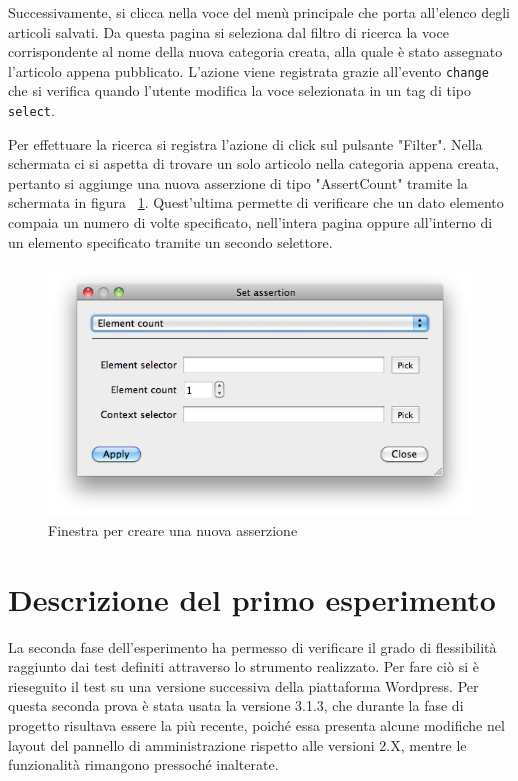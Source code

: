 Successivamente, si clicca nella voce del menù principale che porta all'elenco degli articoli salvati. Da questa pagina si seleziona dal filtro di ricerca la voce corrispondente al nome della nuova categoria creata, alla quale è stato assegnato l'articolo appena pubblicato. L'azione viene registrata grazie all'evento \verb|change| che si verifica quando l'utente modifica la voce selezionata in un tag di tipo \verb|select|. 

Per effettuare la ricerca si registra l'azione di click sul pulsante "Filter". Nella schermata ci si aspetta di trovare un solo articolo nella categoria appena creata, pertanto si aggiunge una nuova asserzione di tipo "AssertCount" tramite la schermata in figura ~\ref{fig:assertCountDialog}. Quest'ultima permette di verificare che un dato elemento compaia un numero di volte specificato, nell'intera pagina oppure all'interno di un elemento specificato tramite un secondo selettore.

\begin{figure}[htbp]
\begin{center}
\includegraphics[width=\textwidth]{images/wp_tour/9_count_dialog.png}
\caption{Finestra per creare una nuova asserzione}
\label{fig:assertCountDialog}
\end{center}
\end{figure}

\section{Descrizione del primo esperimento}

La seconda fase dell'esperimento ha permesso di verificare il grado di flessibilità raggiunto dai test definiti attraverso lo strumento realizzato. Per fare ciò si è rieseguito il test su una versione successiva della piattaforma Wordpress. Per questa seconda prova è stata usata la versione 3.1.3, che durante la fase di progetto risultava essere la più recente, poiché essa presenta alcune modifiche nel layout del pannello di amministrazione rispetto alle versioni 2.X, mentre le funzionalità rimangono pressoché inalterate.

